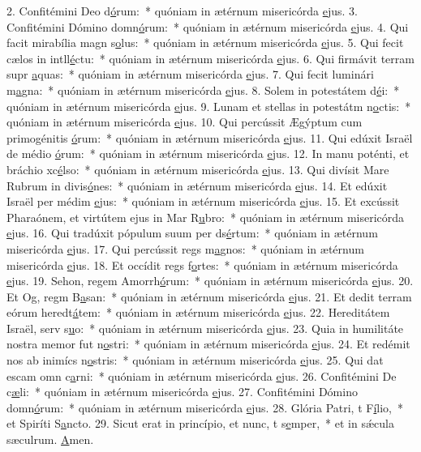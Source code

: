 2. Confitémini Deo d\uline{ó}rum:~* quóniam in ætérnum misericórda \uline{e}jus.
3. Confitémini Dómino domn\uline{ó}rum:~* quóniam in ætérnum misericórda \uline{e}jus.
4. Qui facit mirabília magn s\uline{o}lus:~* quóniam in ætérnum misericórda \uline{e}jus.
5. Qui fecit cælos in intll\uline{é}ctu:~* quóniam in ætérnum misericórda \uline{e}jus.
6. Qui firmávit terram supr \uline{a}quas:~* quóniam in ætérnum misericórda \uline{e}jus.
7. Qui fecit luminári m\uline{a}gna:~* quóniam in ætérnum misericórda \uline{e}jus.
8. Solem in potestátem d\uline{é}i:~* quóniam in ætérnum misericórda \uline{e}jus.
9. Lunam et stellas in potestátm n\uline{o}ctis:~* quóniam in ætérnum misericórda \uline{e}jus.
10. Qui percússit Ægýptum cum primogénitis \uline{ó}rum:~* quóniam in ætérnum misericórda \uline{e}jus.
11. Qui edúxit Israël de médio \uline{ó}rum:~* quóniam in ætérnum misericórda \uline{e}jus.
12. In manu poténti, et bráchio xc\uline{é}lso:~* quóniam in ætérnum misericórda \uline{e}jus.
13. Qui divísit Mare Rubrum in divis\uline{ó}nes:~* quóniam in ætérnum misericórda \uline{e}jus.
14. Et edúxit Israël per médim \uline{e}jus:~* quóniam in ætérnum misericórda \uline{e}jus.
15. Et excússit Pharaónem, et virtútem ejus in Mar R\uline{u}bro:~* quóniam in ætérnum misericórda \uline{e}jus.
16. Qui tradúxit pópulum suum per ds\uline{é}rtum:~* quóniam in ætérnum misericórda \uline{e}jus.
17. Qui percússit regs m\uline{a}gnos:~* quóniam in ætérnum misericórda \uline{e}jus.
18. Et occídit regs f\uline{o}rtes:~* quóniam in ætérnum misericórda \uline{e}jus.
19. Sehon, regem Amorrh\uline{ó}rum:~* quóniam in ætérnum misericórda \uline{e}jus.
20. Et Og, regm B\uline{a}san:~* quóniam in ætérnum misericórda \uline{e}jus.
21. Et dedit terram eórum heredt\uline{á}tem:~* quóniam in ætérnum misericórda \uline{e}jus.
22. Hereditátem Israël, serv s\uline{u}o:~* quóniam in ætérnum misericórda \uline{e}jus.
23. Quia in humilitáte nostra memor fut n\uline{o}stri:~* quóniam in ætérnum misericórda \uline{e}jus.
24. Et redémit nos ab inimícs n\uline{o}stris:~* quóniam in ætérnum misericórda \uline{e}jus.
25. Qui dat escam omn c\uline{a}rni:~* quóniam in ætérnum misericórda \uline{e}jus.
26. Confitémini De c\uline{æ}li:~* quóniam in ætérnum misericórda \uline{e}jus.
27. Confitémini Dómino domn\uline{ó}rum:~* quóniam in ætérnum misericórda \uline{e}jus.
28. Glória Patri, t F\uline{í}lio,~* et Spiríti S\uline{a}ncto.
29. Sicut erat in princípio, et nunc, t s\uline{e}mper,~* et in sǽcula sæculrum. \uline{A}men.
